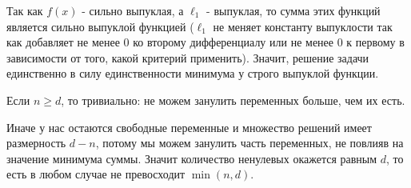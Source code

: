 \documentclass[a5paper,twoside,russian]{article}
\begin{document}
\begin{enumerate}[label=\textbf{Задача \arabic*.}]
        \begin{prf}
            Так как $f(x)$ - сильно выпуклая, а $\ell_1$ - выпуклая, то сумма этих функций является сильно выпуклой функцией
            ($\ell_1$ не меняет константу выпуклости так как добавляет не менее 0 ко второму дифференциалу или не менее 0
            к первому в зависимости от того, какой критерий применить).
            Значит, решение задачи единственно в силу единственности минимума у строго выпуклой функции.

            Если $n \geq d$, то тривиально: не можем занулить переменных больше, чем их есть.
            
            Иначе у нас остаются свободные переменные и множество решений имеет размерность $d - n$, потому мы можем занулить
            часть переменных, не повлияв на значение минимума суммы.
            Значит количество ненулевых окажется равным $d$, то есть в любом случае не превосходит $\min(n, d)$.
        \end{prf}

    \end{enumerate}
\end{document}
